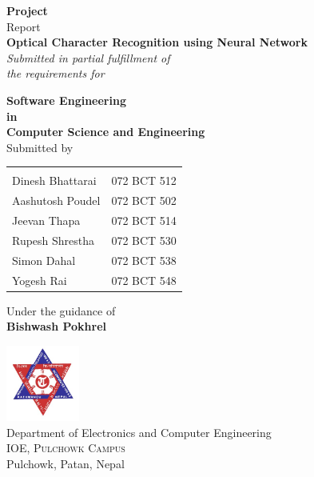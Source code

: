 \begin{titlepage}

\begin{center}

\textup{\small {\bf Project} \\ Report}\\[0.2in]

\Large \textbf {Optical Character Recognition using Neural Network}\\[0.5in]

       \small \emph{Submitted in partial fulfillment of\\
        the requirements for}
        \vspace{.2in}

       {\bf Software Engineering \\in\\ Computer Science and Engineering}\\[0.5in]

\normalsize Submitted by \\
\begin{table}[h]
\centering
\begin{tabular}{lr}\hline \\
		Dinesh Bhattarai    &   072 BCT 512\\
		Aashutosh Poudel    &   072 BCT 502\\
		Jeevan Thapa        &   072 BCT 514\\
		Rupesh Shrestha     &   072 BCT 530\\
		Simon Dahal         &   072 BCT 538\\
		Yogesh Rai          &   072 BCT 548\\ \hline
\end{tabular}
\end{table}

\vspace{.1in}
Under the guidance of\\
{\textbf{Bishwash Pokhrel}}\\[0.2in]

\vfill

\includegraphics[width=0.18\textwidth]{./img/tu}\\[0.1in]
\Large{Department of Electronics and Computer Engineering}\\
\normalsize
\textsc{IOE, Pulchowk Campus}\\
Pulchowk, Patan, Nepal\\
\vspace{0.2cm}

\end{center}
\end{titlepage}
